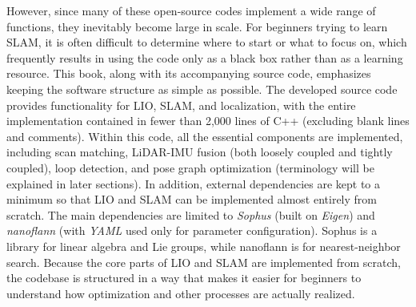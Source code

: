 However, since many of these open-source codes implement a wide range of functions, they inevitably become large in scale.
For beginners trying to learn SLAM, it is often difficult to determine where to start or what to focus on, which frequently results in using the code only as a black box rather than as a learning resource.
This book, along with its accompanying source code, emphasizes keeping the software structure as simple as possible.
The developed source code provides functionality for LIO, SLAM, and localization, with the entire implementation contained in fewer than 2,000 lines of C++ (excluding blank lines and comments).
Within this code, all the essential components are implemented, including scan matching, LiDAR-IMU fusion (both loosely coupled and tightly coupled), loop detection, and pose graph optimization (terminology will be explained in later sections).
In addition, external dependencies are kept to a minimum so that LIO and SLAM can be implemented almost entirely from scratch.
The main dependencies are limited to {\it Sophus} (built on {\it Eigen}) and {\it nanoflann} (with {\it YAML} used only for parameter configuration).
Sophus is a library for linear algebra and Lie groups, while nanoflann is for nearest-neighbor search.
Because the core parts of LIO and SLAM are implemented from scratch, the codebase is structured in a way that makes it easier for beginners to understand how optimization and other processes are actually realized.

